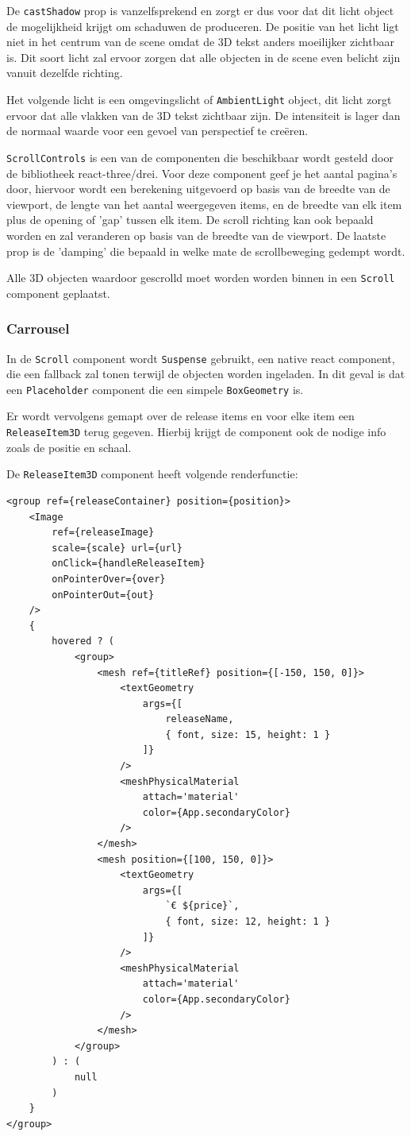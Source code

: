 De \texttt{castShadow} prop is vanzelfsprekend en zorgt er dus voor dat dit licht object de mogelijkheid krijgt om schaduwen de produceren. De positie van het licht ligt niet in het centrum van de scene omdat de 3D tekst anders moeilijker zichtbaar is. Dit soort licht zal ervoor zorgen dat alle objecten in de scene even belicht zijn vanuit dezelfde richting.

Het volgende licht is een omgevingslicht of \texttt{AmbientLight} object, dit licht zorgt ervoor dat alle vlakken van de 3D tekst zichtbaar zijn. De intensiteit is lager dan de normaal waarde voor een gevoel van perspectief te creëren.

\texttt{ScrollControls} is een van de componenten die beschikbaar wordt gesteld door de bibliotheek react-three/drei. Voor deze component geef je het aantal pagina's door, hiervoor wordt een berekening uitgevoerd op basis van de breedte van de viewport, de lengte van het aantal weergegeven items, en de breedte van elk item plus de opening of 'gap' tussen elk item. De scroll richting kan ook bepaald worden en zal veranderen op basis van de breedte van de viewport. De laatste prop is de 'damping' die bepaald in welke mate de scrollbeweging gedempt wordt.

Alle 3D objecten waardoor gescrolld moet worden worden binnen in een \texttt{Scroll} component geplaatst.

\subsubsection{Carrousel}

In de \texttt{Scroll} component wordt \texttt{Suspense} gebruikt, een native react component, die een fallback zal tonen terwijl de objecten worden ingeladen. In dit geval is dat een \texttt{Placeholder} component die een simpele \texttt{BoxGeometry} is.

Er wordt vervolgens gemapt over de release items en voor elke item een \texttt{ReleaseItem3D} terug gegeven. Hierbij krijgt de component ook de nodige info zoals de positie en schaal.

De \texttt{ReleaseItem3D} component heeft volgende renderfunctie:

\begin{BVerbatim}
<group ref={releaseContainer} position={position}>
	<Image 
		ref={releaseImage} 
		scale={scale} url={url} 
		onClick={handleReleaseItem} 
		onPointerOver={over} 
		onPointerOut={out} 
	/>
	{
		hovered ? (
			<group>
				<mesh ref={titleRef} position={[-150, 150, 0]}>
					<textGeometry 
						args={[
							releaseName,
							{ font, size: 15, height: 1 }
						]} 
					/>
					<meshPhysicalMaterial 
						attach='material' 
						color={App.secondaryColor} 
					/>
				</mesh>
				<mesh position={[100, 150, 0]}>
					<textGeometry 
						args={[
							`€ ${price}`,
							{ font, size: 12, height: 1 }
						]} 
					/>
					<meshPhysicalMaterial 
						attach='material' 
						color={App.secondaryColor} 
					/>
				</mesh>
			</group>
		) : (
			null
		)
	}
</group>
\end{BVerbatim}


